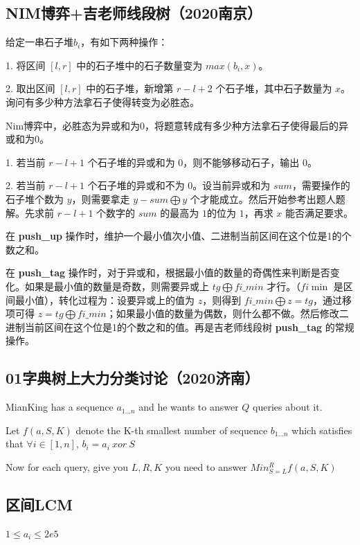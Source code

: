 \documentclass[twoside,a4paper]{article}
\begin{document}
\subsection{NIM博弈+吉老师线段树（2020南京）}
给定一串石子堆$b_{i}$，有如下两种操作：\par
1. 将区间 $[l,r]$ 中的石子堆中的石子数量变为 $max(b_{i}, x)$。\par
2. 取出区间 $[l,r]$ 中的石子堆，新增第 $r-l+2$ 个石子堆，其中石子数量为 $x$。询问有多少种方法拿石子使得转变为必胜态。\par
\par
Nim博弈中，必胜态为异或和为0，将题意转成有多少种方法拿石子使得最后的异或和为0。\par
1. 若当前 $r-l+1$ 个石子堆的异或和为 $0$，则不能够移动石子，输出 $0$。\par
2. 若当前 $r-l+1$ 个石子堆的异或和不为 $0$。设当前异或和为 $sum$，需要操作的石子堆个数为 $y$，则需要拿走 $y-sum \bigoplus y$ 个才能成立。然后开始参考出题人题解。先求前 $r-l+1$ 个数字的 $sum$ 的最高为 $1$的位为 $1$，再求 $x$ 能否满足要求。\par
在 \textbf{push\_up} 操作时，维护一个最小值次小值、二进制当前区间在这个位是1的个数之和。\par
在 \textbf{push\_tag} 操作时，对于异或和，根据最小值的数量的奇偶性来判断是否变化。如果是最小值的数量是奇数，则需要异或上 $tg \bigoplus fi\_min$ 才行。（$fi\min$ 是区间最小值），转化过程为：设要异或上的值为 $z$，则得到 $fi\_min \bigoplus z = tg$，通过移项可得 $z = tg \bigoplus fi\_min$；如果最小值的数量为偶数，则什么都不做。然后修改二进制当前区间在这个位是1的个数之和的值。再是吉老师线段树 \textbf{push\_tag} 的常规操作。


\subsection{01字典树上大力分类讨论（2020济南）}
MianKing has a sequence $a_{1...n}$  and he wants to answer $Q$ queries about it.\par
Let $f(a,S,K)$ denote the K-th smallest number of sequence $b_{1...n}$ which satisfies that $\forall i \in [1,n]$, $b_i=a_i~xor~S$\par
Now for each query, give you $L,R,K$ you need to answer $Min_{S=L}^{R}f(a,S,K)$


\subsection{区间LCM}
$1 \leq a_{i} \leq 2e5$\par

\end{document}
